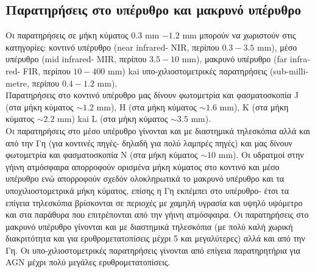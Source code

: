\subsection*{Παρατηρήσεις στο υπέρυθρο και μακρυνό υπέρυθρο}

Οι παρατηρήσεις σε μήκη κύματος $0.3$ m\textlatin{m} $- 1.2$ \textlatin{mm} μπορούν να χωριστούν στις κατηγορίες: κοντινό υπέρυθρο (\textlatin{near infrared- NIR}, περίπου $0.3-3.5$ m\textlatin{m}), μέσο υπέρυθρο (\textlatin{mid infrared- MIR}, περίπου $3.5- 10$ m\textlatin{m}), μακρυνό υπέρυθρο (\textlatin{far infrared- FIR}, περίπου $10-400$ m\textlatin{m}) kai υπο-χιλιοστομετρικές παρατηρήσεις (\textlatin{sub-millimetre}, περίπου $0.4-1.2$ \textlatin{mm}).\\
Παρατηρήσεις στο κοντινό υπέρυθρο μας δίνουν φωτομετρία και φασματοσκοπία \textlatin{J} (στα μήκη κύματος $\sim 1.2$ m\textlatin{m}), \textlatin{H} (στα μήκη κύματος $\sim 1.6$ m\textlatin{m}), \textlatin{K} (στα μήκη κύματος $\sim 2.2$ m\textlatin{m}) kai \textlatin{L} (στα μήκη κύματος $\sim 3.5$ m\textlatin{m}).\\
Οι παρατηρήσεις στο μέσο υπέρυθρο γίνονται και με διαστημικά τηλεσκόπια αλλά και από την Γη (για κοντινές πηγές- δηλαδή για πολύ λαμπρές πηγές) και μας δίνουν φωτομετρία και φασματοσκοπία \textlatin{Ν} (στα μήκη κύματος $\sim 10$ m\textlatin{m}). Οι υδρατμοί στην γήινη ατμόσφαιρα απορροφούν ορισμένα μήκη κύματος στο κοντινό και μέσο υπέρυθρο ενώ απορροφούν σχεδόν ολοκληρωτικά το μακρυνό υπέρυθρο και τα υποχιλιοστομετρικά μήκη κύματος, επίσης η Γη εκπέμπει στο υπέρυθρο- έτσι τα επίγεια τηλεσκόπια βρίσκονται σε περιοχές με χαμηλή υγρασία και υψηλό υψόμετρο και στα παράθυρα που επιτρέπονται από την γήινη ατμόσφαιρα. Οι παρατηρήσεις στο μακρυνό υπέρυθρο γίνονται και με διαστημικά τηλεσκόπια (με πολύ καλή χωρική διακριτότητα και για ερυθρομετατοπίσεις μέχρι 5 και μεγαλύτερες) αλλά και από την Γη. Οι υπο-χιλιοστομετρικές παρατηρήσεις γίνονται από επίγεια παρατηρητήρια για \textlatin{AGN} μέχρι πολύ μεγάλες ερυθρομετατοπίσεις.\\

